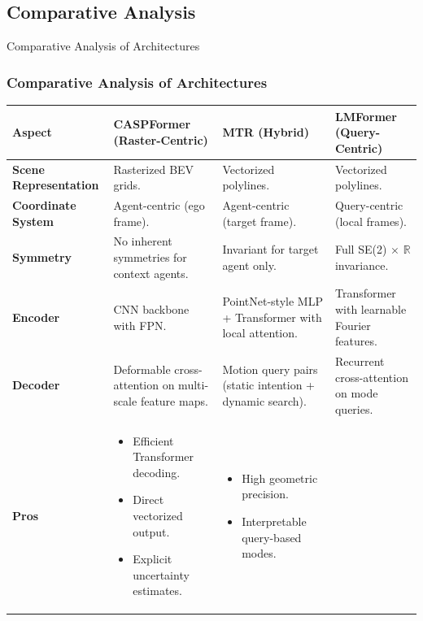 \documentclass[10pt,aspectratio=169]{beamer}
\newcommand{\greenoplus}{\textcolor{mygreen}{\ding{51}}}
\begin{document}
\subsection{Comparative Analysis}

\begin{frame}{Comparative Analysis of Architectures}
    \frametitle{Comparative Analysis of Architectures}
    \begin{table}
    \centering
    \tiny
    \renewcommand{\arraystretch}{1.2}
    \begin{tabular}{|p{1.9cm}|p{3.9cm}|p{3.9cm}|p{3.9cm}|}
        \hline
        \textbf{Aspect} & \textbf{CASPFormer (Raster-Centric)} & \textbf{MTR (Hybrid)} & \textbf{LMFormer (Query-Centric)} \\
        \hline
        \textbf{Scene Representation} & Rasterized BEV grids. & Vectorized polylines. & Vectorized polylines. \\
        \hline
        \textbf{Coordinate System} & Agent-centric (ego frame). & Agent-centric (target frame). & Query-centric (local frames). \\
        \hline
        \textbf{Symmetry} & No inherent symmetries for context agents. & Invariant for target agent only. & Full SE(2) \(\times\) \(\mathbb{R}\) invariance. \\
        \hline
        \textbf{Encoder} & CNN backbone with FPN. & PointNet-style MLP + Transformer with local attention. & Transformer with learnable Fourier features. \\
        \hline
        \textbf{Decoder} & Deformable cross-attention on multi-scale feature maps. & Motion query pairs (static intention + dynamic search). & Recurrent cross-attention on mode queries. \\
        \hline
        \textbf{Pros} \greenoplus &
        \begin{itemize}
            \item Efficient Transformer decoding.
            \item Direct vectorized output.
            \item Explicit uncertainty estimates.
        \end{itemize} &
        \begin{itemize}
            \item High geometric precision.
            \item Interpretable query-based modes.

\end{itemize}
\end{tabular}
\end{table}
\end{frame}
\end{document}
